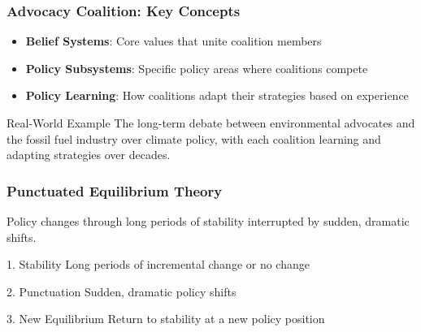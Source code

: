 \documentclass[10pt]{beamer}
\begin{document}
\begin{frame}
\frametitle{Advocacy Coalition: Key Concepts}

\begin{itemize}
  \item \textbf{Belief Systems}: Core values that unite coalition members
  \item \textbf{Policy Subsystems}: Specific policy areas where coalitions compete
  \item \textbf{Policy Learning}: How coalitions adapt their strategies based on experience
\end{itemize}

\vspace{0.5cm}

\begin{alertblock}{Real-World Example}
The long-term debate between environmental advocates and the fossil fuel industry over climate policy, with each coalition learning and adapting strategies over decades.
\end{alertblock}

\end{frame}

\begin{frame}
\frametitle{Punctuated Equilibrium Theory}

Policy changes through long periods of stability interrupted by sudden, dramatic shifts.

\vspace{0.5cm}

\begin{block}{\textcolor{equilibriumgreen}{1. Stability}}
Long periods of incremental change or no change
\end{block}

\begin{block}{\textcolor{punctuationorange}{2. Punctuation}}
Sudden, dramatic policy shifts
\end{block}

\begin{block}{\textcolor{equilibriumgreen}{3. New Equilibrium}}
Return to stability at a new policy position
\end{block}

\end{frame}
\end{document}
